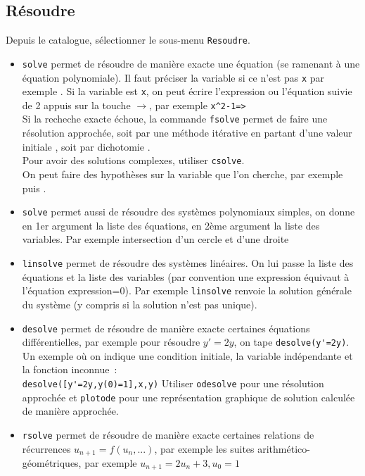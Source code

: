 \documentclass{article}
\begin{document}
\begin{giacjshere}
\subsection{R\'esoudre}
Depuis le catalogue, s\'electionner le sous-menu \verb|Resoudre|.
\begin{itemize}
\item \verb|solve| permet de r\'esoudre de mani\`ere exacte
une \'equation (se ramenant \`a une \'equation polynomiale).
Il faut pr\'eciser la variable si ce n'est pas \verb|x| par
exemple . Si la
variable est \verb|x|, on peut \'ecrire l'expression
ou l'\'equation suivie de 2 appuis sur la touche $\rightarrow$,
par exemple \verb|x^2-1=>|\\
Si la recheche exacte \'echoue, la commande \verb|fsolve|
permet de faire une r\'esolution approch\'ee, soit par
une m\'ethode it\'erative en partant d'une valeur
initiale , soit par
dichotomie  .\\
Pour avoir des solutions complexes, utiliser \verb|csolve|.\\
On peut faire des hypoth\`eses sur la variable que l'on cherche,
par exemple  puis .
\item \verb|solve| permet aussi de r\'esoudre des syst\`emes
polynomiaux simples, on donne en 1er argument la liste des
\'equations, en 2\`eme argument la liste des variables.
Par exemple intersection d'un cercle et d'une droite
\item \verb|linsolve| permet de r\'esoudre des syst\`emes
lin\'eaires. On lui passe la liste des \'equations et la liste
des variables (par convention une expression \'equivaut
\`a l'\'equation expression=0). Par exemple
\verb|linsolve| renvoie la solution g\'en\'erale du syst\`eme 
(y compris si la solution n'est pas unique).
\item \verb|desolve| permet de r\'esoudre de mani\`ere exacte
certaines \'equations diff\'erentielles, par exemple 
pour r\'esoudre $y'=2y$, on tape \verb|desolve(y'=2y)|.\\
Un exemple o\`u on indique une condition initiale, 
la variable ind\'ependante
et la fonction inconnue~:\\
\verb|desolve([y'=2y,y(0)=1],x,y)|
Utiliser \verb|odesolve|
pour une r\'esolution approch\'ee et \verb|plotode| pour une
repr\'esentation graphique de solution calcul\'ee de mani\`ere
approch\'ee. 
\item \verb|rsolve| permet de r\'esoudre de mani\`ere exacte
certaines relations de r\'ecurrences $u_{n+1}=f(u_n,...)$,
par exemple les suites arithm\'etico-g\'eom\'etriques, par
exemple $u_{n+1}=2u_n+3, u_0=1$
\end{itemize}


\end{giacjshere}
\end{document}
